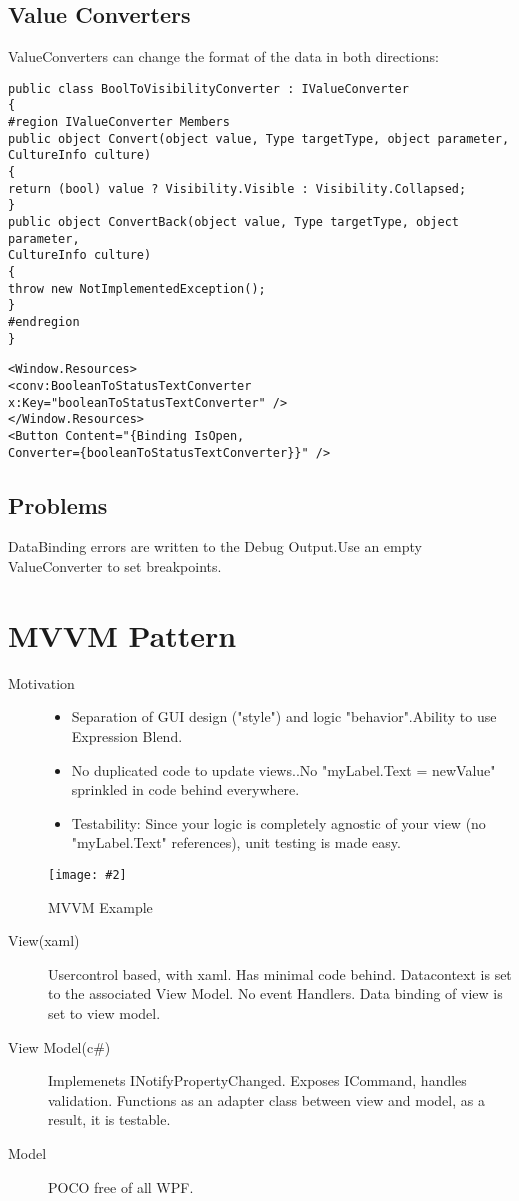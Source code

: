 \documentclass[a4paper,10pt]{scrreprt}
\newcommand{\pic}[2][figure]{\begin{figure}[h]
 \centering
 \texttt{[image: \#2]}
 \caption{#1}
\end{figure}
}
\begin{document}
\subsection{Value Converters}
ValueConverters can change the format of the data in both directions:
\begin{lstlisting}[caption=ValueConverter Example]
public class BoolToVisibilityConverter : IValueConverter
{
#region IValueConverter Members
public object Convert(object value, Type targetType, object parameter,
CultureInfo culture)
{
return (bool) value ? Visibility.Visible : Visibility.Collapsed;
}
public object ConvertBack(object value, Type targetType, object parameter,
CultureInfo culture)
{
throw new NotImplementedException();
}
#endregion
}
\end{lstlisting}
\begin{lstlisting}[caption=ValueConverter in XAML]
<Window.Resources>
<conv:BooleanToStatusTextConverter
x:Key="booleanToStatusTextConverter" />
</Window.Resources>
<Button Content="{Binding IsOpen,
Converter={booleanToStatusTextConverter}}" />
\end{lstlisting}

\subsection{Problems}
DataBinding errors are written to the Debug Output.Use an empty ValueConverter to set breakpoints.


\section{MVVM Pattern}
\begin{description}
\item[Motivation]
\begin{itemize}
\item Separation of GUI design ("style") and logic "behavior".Ability to use Expression Blend.
\item No duplicated code to update views..No "myLabel.Text = newValue" sprinkled in code behind everywhere.
\item Testability: Since your logic is completely agnostic of your view (no "myLabel.Text" references), unit testing is made easy.
\end{itemize}
\end{description}
\pic[MVVM Example]{mvvm.png}
\begin{description}
\item [View(xaml)] Usercontrol based, with xaml. Has minimal code behind. Datacontext is set to the associated View Model. No event Handlers. Data binding of view is set to view model.
\item [View Model(c\#)] Implemenets INotifyPropertyChanged. Exposes ICommand, handles validation. Functions as an adapter class between view and model, as a result, it is testable.
\item [Model] POCO free of all WPF.
\end{description}
\end{document}
